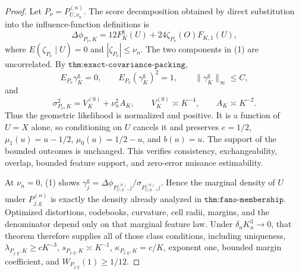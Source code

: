 \documentclass{article}
\begin{document}
\begin{proof}
Let \(P_\nu=P_{U,\nu_n}^{(n)}\).  The score decomposition obtained by direct substitution into the influence-function definitions is
\[
 \Delta\phi_{P_\nu,K}
 =12F^{\mathrm g}_K(U)+24\zeta_{P_\nu}(O)F_{K,1}(U),                                    \tag{1}
\]
where \(E(\zeta_{P_\nu}\mid U)=0\) and \(|\zeta_{P_\nu}|\leq\nu_n\).  The two components in (1) are uncorrelated.  By \(\texttt{thm:exact-covariance-packing}\),
\[
 E_{P_\nu}\gamma_K^{\mathrm g}=0,\qquad
 E_{P_\nu}(\gamma_K^{\mathrm g})^2=1,\qquad
 \|\gamma_K^{\mathrm g}\|_\infty\leq C,                                               \tag{2}
\]
and
\[
 \sigma_{P_\nu,K}^2=V_K^{(0)}+\nu_n^2A_K,\qquad
 V_K^{(0)}\asymp K^{-4},\qquad A_K\asymp K^{-2}.                                       \tag{3}
\]
Thus the geometric likelihood is normalized and positive.  It is a function of \(U=X\) alone, so conditioning on \(U\) cancels it and preserves \(e=1/2\), \(\mu_1(u)=u-1/2\), \(\mu_0(u)=1/2-u\), and \(b(u)=u\).  The support of the bounded outcomes is unchanged.  This verifies consistency, exchangeability, overlap, bounded feature support, and zero-error nuisance estimability.

At \(\nu_n=0\), (1) shows \(\gamma_j^{\mathrm g}=\Delta\phi_{P_{U,0}^{(n)},j}/\sigma_{P_{U,0}^{(n)},j}\).  Hence the marginal density of \(U\) under \(P_{j,\mathrm g}^{(n)}\) is exactly the density already analyzed in \(\texttt{thm:fano-membership}\).  Optimized distortions, codebooks, curvature, cell radii, margins, and the denominator depend only on that marginal feature law.  Under \(\delta_nK_n^3\to0\), that theorem therefore supplies all of those class conditions, including uniqueness, \(\lambda_{P_{j,\mathrm g},K}\geq cK^{-3}\), \(s_{P_{j,\mathrm g},K}\asymp K^{-1}\), \(\kappa_{P_{j,\mathrm g},K}=c/K\), exponent one, bounded margin coefficient, and \(W_{P_{j,\mathrm g}}(1)\geq1/12\).


\end{proof}
\end{document}
